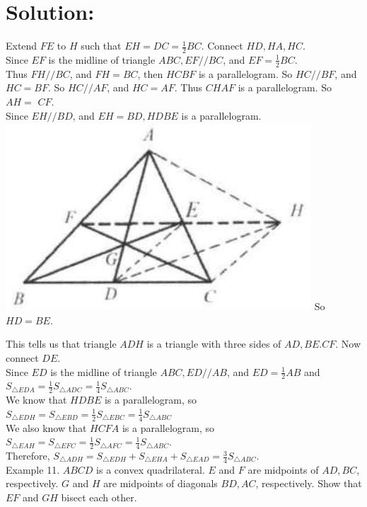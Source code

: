 \documentclass[10pt]{article}
\begin{document}
\section*{Solution:}
Extend \(F E\) to \(H\) such that \(E H=D C=\frac{1}{2} B C\). Connect \(H D, H A, H C\).\\
Since \(E F\) is the midline of triangle \(A B C, E F / / B C\), and \(E F=\frac{1}{2} B C\).\\
Thus \(F H / / B C\), and \(F H=B C\), then \(H C B F\) is a parallelogram. So \(H C / / B F\), and \(H C=B F\). So \(H C / / A F\), and \(H C=A F\). Thus \(C H A F\) is a parallelogram. So \(A H=\) \(C F\).\\
Since \(E H / / B D\), and \(E H=B D, H D B E\) is a parallelogram.\\
\includegraphics[max width=\textwidth]{2025_04_17_97bc1f7e44d93c271a88g-041} So \(H D=B E\).

This tells us that triangle \(A D H\) is a triangle with three sides of \(A D, B E . C F\). Now connect \(D E\).\\
Since \(E D\) is the midline of triangle \(A B C, E D / / A B\), and \(E D=\frac{1}{2} A B\) and \(S_{\triangle E D A}=\frac{1}{2} S_{\triangle A D C}=\frac{1}{4} S_{\triangle A B C}\).\\
We know that \(H D B E\) is a parallelogram, so \(S_{\triangle E D H}=S_{\triangle E B D}=\frac{1}{2} S_{\triangle E B C}=\frac{1}{4} S_{\triangle A B C}\)\\
We also know that \(H C F A\) is a parallelogram, so\\
\(S_{\triangle E A H}=S_{\triangle E F C}=\frac{1}{2} S_{\triangle A F C}=\frac{1}{4} S_{\triangle A B C}\).\\
Therefore, \(S_{\triangle A D H}=S_{\triangle E D H}+S_{\triangle E H A}+S_{\triangle E A D}=\frac{3}{4} S_{\triangle A B C}\).\\
Example 11. \(A B C D\) is a convex quadrilateral. \(E\) and \(F\) are midpoints of \(A D, B C\), respectively. \(G\) and \(H\) are midpoints of diagonals \(B D, A C\), respectively. Show that \(E F\) and \(G H\) bisect each other.
\end{document}
